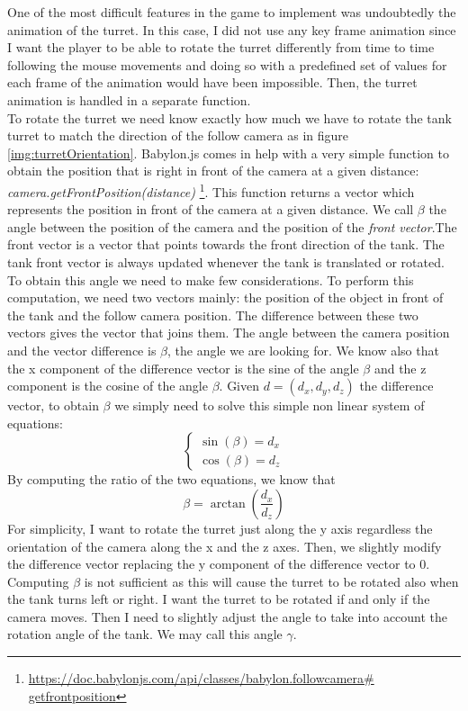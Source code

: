 \documentclass[14pt]{article}
\begin{document}
One of the most difficult features in the game to implement was undoubtedly the animation of the turret. In this case, I did not use any key frame animation since I want the player to be able to rotate the turret differently from time to time following the mouse movements and doing so with a predefined set of values for each frame of the animation would have been impossible. Then, the turret animation is handled in a separate function.\\
To rotate the turret we need know exactly how much we have to rotate the tank turret to match the direction of the follow camera as in figure \ref{img:turretOrientation}. Babylon.js comes in help with a very simple function to obtain the position that is right in front of the camera at a given distance: \textit{camera.getFrontPosition(distance)} \footnote{\url{https://doc.babylonjs.com/api/classes/babylon.followcamera\# getfrontposition}}. This function returns a vector which represents the position in front of the camera at a given distance. We call \(\beta\) the angle between the position of the camera and the position of the \textit{front vector}.The front vector is a vector that points towards the front direction of the tank. The tank front vector is always updated whenever the tank is translated or rotated. To obtain this angle we need to make few considerations.
To perform this computation, we need two vectors mainly: the position of the object in front of the tank and the follow camera position. The difference between these two vectors gives the vector that joins them. The angle between the camera position and the vector difference is \(\beta\), the angle we are looking for. We know also that the x component of the difference vector is the sine of the angle \(\beta\) and the z component is the cosine of the angle \(\beta\). Given \(d= (d_{x},d_{y},d_{z})\) the difference vector, to obtain \(\beta\) we simply need to solve this simple non linear system of equations:
\begin{equation}\label{eq:animateTurret}
\begin{cases}
\sin(\beta) = d_{x}\\
\cos(\beta) = d_{z}
\end{cases}
\end{equation}
By computing the ratio of the two equations, we know that 
\begin{equation}\label{eq:beta}
\beta = \arctan\left(\frac{d_{x}}{d_{z}}\right)
\end{equation}
For simplicity, I want to rotate the turret just along the y axis regardless the orientation of the camera along the x and the z axes. Then, we slightly modify the difference vector replacing the y component of the difference vector to 0. Computing \(\beta\) is not sufficient as this will cause the turret to be rotated also when the tank turns left or right. I want the turret to be rotated if and only if the camera moves. Then I need to slightly adjust the angle to take into account the rotation angle of the tank. We may call this angle \(\gamma\).
\end{document}
